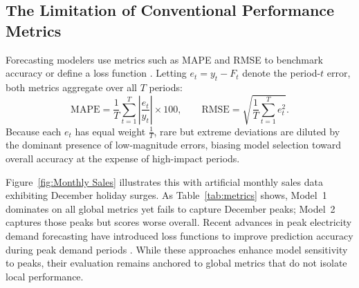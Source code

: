 \documentclass[]{interact}
\theoremstyle{definition}
\begin{document}

\subsection{The Limitation of Conventional Performance Metrics}
Forecasting modelers use metrics such as MAPE and RMSE to benchmark accuracy or define a loss function \citep{petropoulos2022}. Letting $e_t = y_t - F_t$ denote the period-$t$ error, both metrics aggregate over all $T$ periods:
\begin{equation}
\text{MAPE} = \frac{1}{T} \sum_{t=1}^{T} \left| \frac{e_t}{y_t} \right| \times 100,
\qquad
\text{RMSE} = \sqrt{\frac{1}{T} \sum_{t=1}^{T} e_t^2}.
\end{equation}
Because each $e_t$ %
has equal weight $\frac{1}{T}$, rare but extreme deviations are diluted by the dominant presence of low-magnitude errors, biasing model selection toward overall accuracy at the expense of high-impact periods.

Figure~\ref{fig:Monthly Sales} illustrates this with artificial monthly sales data exhibiting December holiday surges. As Table~\ref{tab:metrics} shows, Model~1 dominates on all global metrics yet fails to capture December peaks; Model~2 captures those peaks but scores worse overall. Recent advances in peak electricity demand forecasting have introduced loss functions to improve prediction accuracy during peak demand periods \citep{nygard2025}. While these approaches enhance model sensitivity to peaks, their evaluation remains anchored to global metrics that do not isolate local performance.
\end{document}
